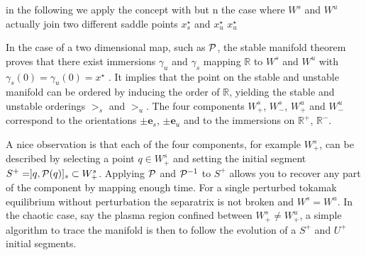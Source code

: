 in the following we apply the concept with but n the case where $W^s$ and $W^u$ actually join two different saddle points $x_s^\star$ and $x_u^\star$ $x_u^\star$

In the case of a two dimensional map, such as $\mathcal{P}$, the stable manifold theorem proves that there exist immersions $\gamma_u$ and $\gamma_s$ mapping $\mathbb{R}$ to $W^s$ and $W^u$ with $\gamma_s(0) = \gamma_u(0) = x^\star$ \cite{easton_trellises_1986}. It implies that the point on the stable and unstable manifold can be ordered by inducing the order of $\mathbb{R}$, yielding the stable and unstable orderings $>_s$ and $>_u$. The four components $W_+^s$, $W_-^s$, $W_+^u$ and $W_-^u$ correspond to the orientations $\pm\textbf{e}_s$, $\pm\textbf{e}_u$ and to the immersions on $\mathbb{R}^+$, $\mathbb{R}^-$. 

A nice observation is that each of the four components, for example $W^s_+$, can be described by selecting a point $q \in W^s_+$ and setting the initial segment $S^+ = ]q,\mathcal{P}(q)]_s \subset W^s_+$. Applying $\mathcal{P}$ and $\mathcal{P}^{-1}$ to $S^+$ allows you to recover any part of the component by mapping enough time. For a single perturbed tokamak equilibrium without perturbation the separatrix is not broken and $W^s = W^u$. In the chaotic case, say the plasma region confined between $W^s_+ \neq W^u_+$, a simple algorithm to trace the manifold is then to follow the evolution of a $S^+$ and $U^+$ initial segments. 

